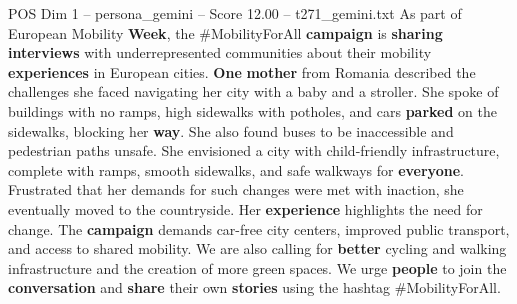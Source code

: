 \begin{textsample}{POS Dim 1 – persona\_gemini – Score 12.00 – t271\_gemini.txt}  \label{ex:f1_pos_048}
As part of European Mobility \textbf{Week}, the \#MobilityForAll \textbf{campaign} is \textbf{sharing} \textbf{interviews} with underrepresented communities about their mobility \textbf{experiences} in European cities. \textbf{One} \textbf{mother} from Romania described the challenges she faced navigating her city with a baby and a stroller.
She spoke of buildings with no ramps, high sidewalks with potholes, and cars \textbf{parked} on the sidewalks, blocking her \textbf{way}.
She also found buses to be inaccessible and pedestrian paths unsafe.
She envisioned a city with child-friendly infrastructure, complete with ramps, smooth sidewalks, and safe walkways for \textbf{everyone}.
Frustrated that her demands for such changes were met with inaction, she eventually moved to the countryside.
Her \textbf{experience} highlights the need for change.
The \textbf{campaign} demands car-free city centers, improved public transport, and access to shared mobility.
We are also calling for \textbf{better} cycling and walking infrastructure and the creation of more green spaces.
We urge \textbf{people} to join the \textbf{conversation} and \textbf{share} their own \textbf{stories} using the hashtag \#MobilityForAll.

\end{textsample}
